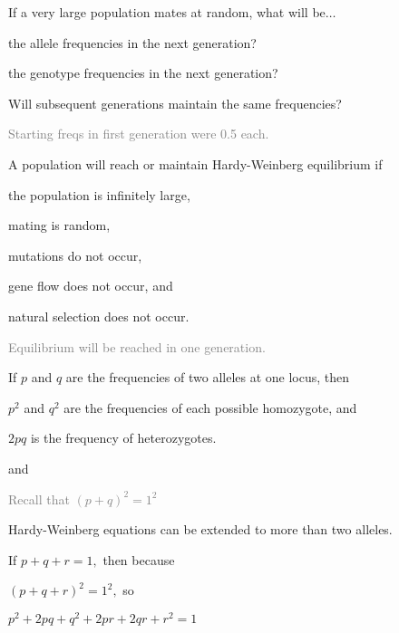 \documentclass[t]{beamer}
\begin{document}
\begin{frame}[t]{If a very large population mates at random, what will be$\dots$}

\hangpara the allele frequencies in the next generation?

\hangpara the genotype frequencies in the next generation?

\hangpara Will subsequent generations maintain the same frequencies?

\vfilll

\hangpara \textcolor{gray}{Starting freqs in first generation were 0.5 each.}
\end{frame}

\begin{frame}[t]{A population will reach or maintain Hardy-Weinberg equilibrium if}

\hangpara the population is infinitely large,

\hangpara mating is random,

\hangpara mutations do not occur,

\hangpara gene flow does not occur, and

\hangpara natural selection does not occur.

\hangpara {}

\vfilll

\textcolor{gray}{Equilibrium will be reached in one generation.}

\end{frame}


\begin{frame}[t]

\hangpara If $p$ and $q$ are the frequencies of two alleles at one locus, then

\hangpara $p^2$ and $q^2$ are the frequencies of each possible homozygote, and 

\hangpara $2pq$ is the frequency of heterozygotes.

\hangpara {} and 

\hangpara \textcolor{gray}{Recall that $(p + q)^2 = 1^2$}

\end{frame}


\begin{frame}[t]{Hardy-Weinberg equations can be extended to more than two alleles.}

\hangpara If $p + q + r = 1,$ then because

\hangpara $(p + q + r)^2 = 1^2,$ so

\hangpara $p^2 + 2pq + q^2 + 2pr + 2qr + r^2 = 1$


\end{frame}
\end{document}
